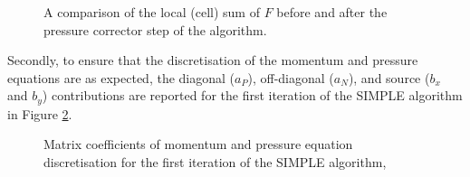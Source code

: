 \documentclass[final,3p,times,twocolumn]{elsarticle}
\begin{document}
\begin{figure}[ht]
    \centering
    \caption{A comparison of the local (cell) sum of $F$ before and after the pressure corrector step of the algorithm.}
    \label{fig:divU}
\end{figure}

Secondly, to ensure that the discretisation of the momentum and pressure equations are as expected, the diagonal ($a_P$), off-diagonal ($a_N$), and source ($b_x$ and $b_y$) contributions are reported for the first iteration of the SIMPLE algorithm in Figure \ref{fig:mat_coeff}.

\begin{figure}[ht]
    \centering
    \caption{Matrix coefficients of momentum and pressure equation discretisation for the first iteration of the SIMPLE algorithm, }
    \label{fig:mat_coeff}
\end{figure}
\end{document}
